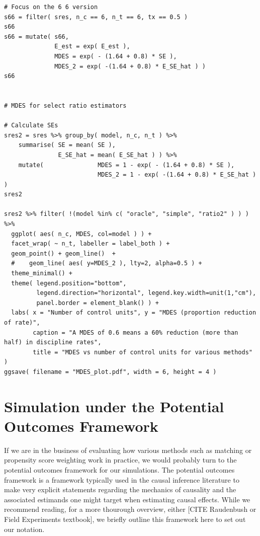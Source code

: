 \documentclass[
]{book}
\begin{document}
\begin{verbatim}
# Focus on the 6 6 version
s66 = filter( sres, n_c == 6, n_t == 6, tx == 0.5 )
s66
s66 = mutate( s66, 
              E_est = exp( E_est ),
              MDES = exp( - (1.64 + 0.8) * SE ),
              MDES_2 = exp( -(1.64 + 0.8) * E_SE_hat ) )
s66


# MDES for select ratio estimators

# Calculate SEs
sres2 = sres %>% group_by( model, n_c, n_t ) %>%
    summarise( SE = mean( SE ),
               E_SE_hat = mean( E_SE_hat ) ) %>%
    mutate(               MDES = 1 - exp( - (1.64 + 0.8) * SE ),
                          MDES_2 = 1 - exp( -(1.64 + 0.8) * E_SE_hat ) )
sres2

sres2 %>% filter( !(model %in% c( "oracle", "simple", "ratio2" ) ) ) %>%
  ggplot( aes( n_c, MDES, col=model ) ) +
  facet_wrap( ~ n_t, labeller = label_both ) +
  geom_point() + geom_line()  +
  #    geom_line( aes( y=MDES_2 ), lty=2, alpha=0.5 ) +
  theme_minimal() +
  theme( legend.position="bottom",
         legend.direction="horizontal", legend.key.width=unit(1,"cm"),
         panel.border = element_blank() ) +
  labs( x = "Number of control units", y = "MDES (proportion reduction of rate)",
        caption = "A MDES of 0.6 means a 60% reduction (more than half) in discipline rates",
        title = "MDES vs number of control units for various methods" )
ggsave( filename = "MDES_plot.pdf", width = 6, height = 4 )
\end{verbatim}

\hypertarget{simulation-under-the-potential-outcomes-framework}{%
\chapter{Simulation under the Potential Outcomes Framework}\label{simulation-under-the-potential-outcomes-framework}}

If we are in the business of evaluating how various methods such as matching or propensity score weighting work in practice, we would probably turn to the potential outcomes framework for our simulations.
The potential outcomes framework is a framework typically used in the causal inference literature to make very explicit statements regarding the mechanics of causality and the associated estimands one might target when estimating causal effects.
While we recommend reading, for a more thourough overview, either {[}CITE Raudenbush or Field Experiments textbook{]}, we briefly outline this framework here to set out our notation.
\end{document}
